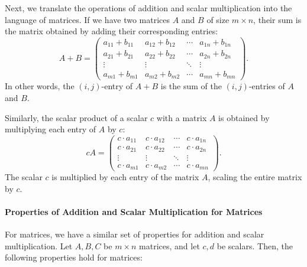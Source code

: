 \documentclass[a4paper,12pt]{article}
\begin{document}
Next, we translate the operations of addition and scalar multiplication into the language of matrices. If we have two matrices \( A \) and \( B \) of size \( m \times n \), their sum is the matrix obtained by adding their corresponding entries:
\[
A + B = \begin{pmatrix}
a_{11} + b_{11} & a_{12} + b_{12} & \cdots & a_{1n} + b_{1n} \\
a_{21} + b_{21} & a_{22} + b_{22} & \cdots & a_{2n} + b_{2n} \\
\vdots & \vdots & \ddots & \vdots \\
a_{m1} + b_{m1} & a_{m2} + b_{m2} & \cdots & a_{mn} + b_{mn}
\end{pmatrix}.
\]
In other words, the \( (i,j) \)-entry of \( A + B \) is the sum of the \( (i,j) \)-entries of \( A \) and \( B \).

Similarly, the scalar product of a scalar \( c \) with a matrix \( A \) is obtained by multiplying each entry of \( A \) by \( c \):
\[
cA = \begin{pmatrix}
c \cdot a_{11} & c \cdot a_{12} & \cdots & c \cdot a_{1n} \\
c \cdot a_{21} & c \cdot a_{22} & \cdots & c \cdot a_{2n} \\
\vdots & \vdots & \ddots & \vdots \\
c \cdot a_{m1} & c \cdot a_{m2} & \cdots & c \cdot a_{mn}
\end{pmatrix}.
\]
The scalar \( c \) is multiplied by each entry of the matrix \( A \), scaling the entire matrix by \( c \).

\paragraph{Properties of Addition and Scalar Multiplication for Matrices}

For matrices, we have a similar set of properties for addition and scalar multiplication. Let \( A, B, C \) be \( m \times n \) matrices, and let \( c, d \) be scalars. Then, the following properties hold for matrices:
\end{document}
